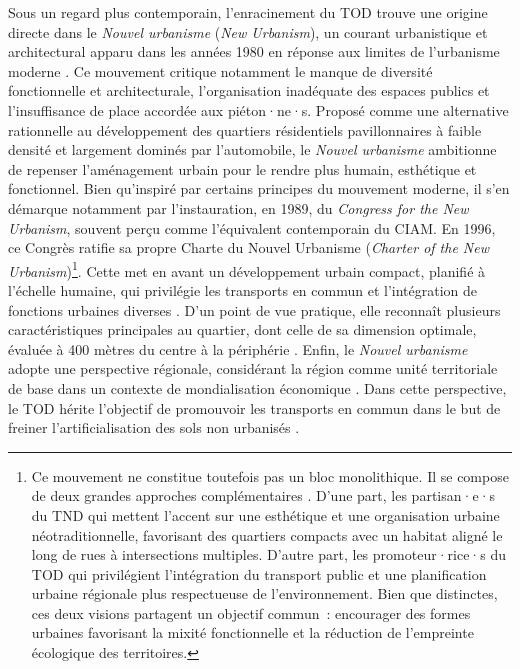 \begin{refsegment}
Sous un regard plus contemporain, l’enracinement du \acrshort{TOD} trouve une origine directe dans le \textsl{Nouvel urbanisme} (\textsl{New Urbanism}), un courant urbanistique et architectural apparu dans les années 1980 en réponse aux limites de l’urbanisme moderne \textcolor{blue}{\autocite[71]{liu_analyse_2016}}. Ce mouvement critique notamment le manque de diversité fonctionnelle et architecturale, l’organisation inadéquate des espaces publics et l’insuffisance de place accordée aux piéton·ne·s. Proposé comme une alternative rationnelle au développement des quartiers résidentiels pavillonnaires à faible densité et largement dominés par l’automobile, le \textsl{Nouvel urbanisme} ambitionne de repenser l’aménagement urbain pour le rendre plus humain, esthétique et fonctionnel. Bien qu’inspiré par certains principes du mouvement moderne, il s’en démarque notamment par l’instauration, en 1989, du \textsl{Congress for the New Urbanism}, souvent perçu comme l’équivalent contemporain du \acrfull{CIAM}. En 1996, ce Congrès ratifie sa propre Charte du Nouvel Urbanisme (\textsl{Charter of the New Urbanism})\footnote{
    Ce mouvement ne constitue toutefois pas un bloc monolithique. Il se compose de deux grandes approches complémentaires \textcolor{blue}{\autocite[178]{ouellet_smart_2006}}. D’une part, les partisan·e·s du \acrfull{TND} qui mettent l’accent sur une esthétique et une organisation urbaine néotraditionnelle, favorisant des quartiers compacts avec un habitat aligné le long de rues à intersections multiples. D’autre part, les promoteur·rice·s du \acrshort{TOD} qui privilégient l’intégration du transport public et une planification urbaine régionale plus respectueuse de l’environnement. Bien que distinctes, ces deux visions partagent un objectif commun~: encourager des formes urbaines favorisant la mixité fonctionnelle et la réduction de l’empreinte écologique des territoires.
}. Cette  met en avant un développement urbain compact, planifié à l’échelle humaine, qui privilégie les transports en commun et l’intégration de fonctions urbaines diverses \textcolor{blue}{\autocite[177]{ouellet_smart_2006}}. D'un point de vue pratique, elle reconnaît plusieurs caractéristiques principales au quartier, dont celle de sa dimension optimale, évaluée à 400 mètres du centre à la périphérie \textcolor{blue}{\autocite[194]{ducharme_ville_2021}}. Enfin, le \textsl{Nouvel urbanisme} adopte une perspective régionale, considérant la région comme unité territoriale de base dans un contexte de mondialisation économique \textcolor{blue}{\autocite[]{calthorpe_regional_2001}}. Dans cette perspective, le \acrshort{TOD} hérite l’objectif de promouvoir les transports en commun dans le but de freiner l'artificialisation des sols non urbanisés \textcolor{blue}{\autocite[117]{lo_feudo_scenario_2014}}.%


\end{refsegment}
